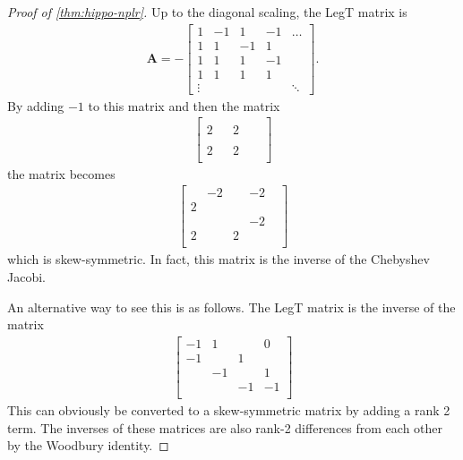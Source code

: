 \begin{proof}[Proof of \cref{thm:hippo-nplr}]
  Up to the diagonal scaling,
  the LegT matrix is
  \begin{align*}
    \bm{A} =
    -
    \begin{bmatrix}
      1      & -1 & 1  & -1  & \dots \\
      1      & 1  & -1 & 1  \\
      1      & 1  & 1  & -1 \\
      1      & 1  & 1  & 1  \\
      \vdots &    &    &     & \ddots
    \end{bmatrix}
    .
  \end{align*}
  By adding \( -1 \) to this matrix and then the matrix
  \begin{align*}
    \begin{bmatrix}
      &  &   &  &  \\
      2 &  & 2 &  &  \\
      &  &   &  &  \\
      2 &  & 2 &  &  \\
    \end{bmatrix}
  \end{align*}
  the matrix becomes
  \begin{align*}
    \begin{bmatrix}
      & -2 &   & -2 &  \\
      2 &    &   &    &  \\
      &    &   & -2 &  \\
      2 &    & 2 &    &  \\
    \end{bmatrix}
  \end{align*}
  which is skew-symmetric.
  In fact, this matrix is the inverse of the Chebyshev Jacobi.

  An alternative way to see this is as follows.
  The LegT matrix is the inverse of the matrix
  \begin{align*}
    \begin{bmatrix}
      -1 & 1  &    & 0  \\
      -1 &    & 1  &    \\
      & -1 &    & 1  \\
      &    & -1 & -1 \\
    \end{bmatrix}
  \end{align*}
  This can obviously be converted to a skew-symmetric matrix by adding a rank 2 term.
  The inverses of these matrices are also rank-2 differences from each other by the Woodbury identity.


\end{proof}
